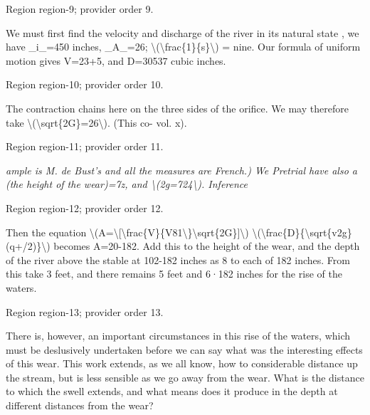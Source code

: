 \documentclass[11pt]{article}
\begin{document}
{\scriptsize\color{gray} Region region-9; provider order 9.\par}
\medskip

We must first find the velocity and discharge of the river in its natural state , we have \_i\_=450 inches, \_A\_=26; \textbackslash{}(\textbackslash{}frac\{1\}\{s\}\textbackslash{}) = nine. Our formula of uniform motion gives V=23+5, and D=30537 cubic inches.
\par

{\scriptsize\color{gray} Region region-10; provider order 10.\par}
\medskip

The contraction chains here on the three sides of the orifice. We may therefore take \textbackslash{}(\textbackslash{}sqrt\{2G\}=26\textbackslash{}). (This co- vol. x).
\par

{\scriptsize\color{gray} Region region-11; provider order 11.\par}
\medskip

{\small\itshape ample is M. de Bust’s and all the measures are French.) We Pretrial have also a (the height of the wear)=7z, and \textbackslash{}(2g=724\textbackslash{}). Inference\par}

{\scriptsize\color{gray} Region region-12; provider order 12.\par}
\medskip

Then the equation \textbackslash{}(A=\textbackslash{}[\textbackslash{}frac\{V\}\{V81\textbackslash{}\}\textbackslash{}sqrt\{2G\}]\textbackslash{}) \textbackslash{}(\textbackslash{}frac\{D\}\{\textbackslash{}sqrt\{v2g\}(q+/2)\}\textbackslash{}) becomes A=20-182. Add this to the height of the wear, and the depth of the river above the stable at 102-182 inches as 8 to each of 182 inches. From this take 3 feet, and there remains 5 feet and 6·182 inches for the rise of the waters.
\par

{\scriptsize\color{gray} Region region-13; provider order 13.\par}
\medskip

There is, however, an important circumstances in this rise of the waters, which must be deslusively undertaken before we can say what was the interesting effects of this wear. This work extends, as we all know, how to considerable distance up the stream, but is less sensible as we go away from the wear. What is the distance to which the swell extends, and what means does it produce in the depth at different distances from the wear?
\par
\end{document}
